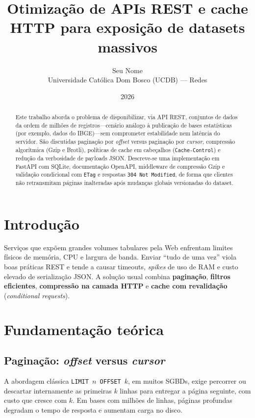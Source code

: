 \documentclass[12pt,a4paper]{article}
\title{Otimização de APIs REST e cache HTTP para exposição de datasets massivos}
\author{Seu Nome \\ Universidade Católica Dom Bosco (UCDB) — Redes}
\date{2026}
\begin{document}
\maketitle

\begin{abstract}
Este trabalho aborda o problema de disponibilizar, via API REST, conjuntos de dados da ordem de milhões de registros---cenário análogo à publicação de bases estatísticas (por exemplo, dados do IBGE)---sem comprometer estabilidade nem latência do servidor. São discutidas paginação por \emph{offset} versus paginação por \emph{cursor}, compressão algorítmica (Gzip e Brotli), políticas de cache em cabeçalhos (\texttt{Cache-Control}) e redução da verbosidade de payloads JSON. Descreve-se uma implementação em FastAPI com SQLite, documentação OpenAPI, middleware de compressão Gzip e validação condicional com \texttt{ETag} e respostas \texttt{304 Not Modified}, de forma que clientes não retransmitam páginas inalteradas após mudanças globais versionadas do dataset.
\end{abstract}

\section{Introdução}

Serviços que expõem grandes volumes tabulares pela Web enfrentam limites físicos de memória, CPU e largura de banda. Enviar ``tudo de uma vez'' viola boas práticas REST e tende a causar timeouts, \emph{spikes} de uso de RAM e custo elevado de serialização JSON. A solução usual combina \textbf{paginação}, \textbf{filtros eficientes}, \textbf{compressão na camada HTTP} e \textbf{cache com revalidação} (\emph{conditional requests}).

\section{Fundamentação teórica}

\subsection{Paginação: \emph{offset} versus \emph{cursor}}

A abordagem clássica \texttt{LIMIT $n$ OFFSET $k$}, em muitos SGBDs, exige percorrer ou descartar internamente as primeiras $k$ linhas para entregar a página seguinte, com custo que cresce com $k$. Em bases com milhões de linhas, páginas profundas degradam o tempo de resposta e aumentam carga no disco.
\end{document}
